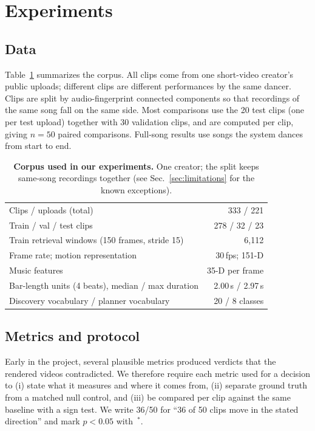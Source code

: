 \documentclass[10pt]{article}
\newcommand{\pairs}[2]{#1/#2}
\begin{document}
\section{Experiments}
\label{sec:experiments}

\subsection{Data}
\label{sec:data}

Table~\ref{tab:data} summarizes the corpus.
All clips come from one short-video creator's public uploads; different clips are different performances by the same dancer.
Clips are split by audio-fingerprint connected components so that recordings of the same song fall on the same side.
Most comparisons use the 20 test clips (one per test upload) together with 30 validation clips, and are computed per clip, giving $n{=}50$ paired comparisons.
Full-song results use songs the system dances from start to end.

\begin{table}[t]
  \centering
  \small
  \caption{\textbf{Corpus used in our experiments.} One creator; the split keeps same-song recordings together (see Sec.~\ref{sec:limitations} for the known exceptions).}
  \label{tab:data}
  \begin{tabular}{@{}lr@{}}
    \toprule
    Clips / uploads (total) & 333 / 221 \\
    Train / val / test clips & 278 / 32 / 23 \\
    Train retrieval windows (150 frames, stride 15) & 6{,}112 \\
    Frame rate; motion representation & 30\,fps; 151-D \\
    Music features & 35-D per frame \\
    Bar-length units (4 beats), median / max duration & 2.00\,s / 2.97\,s \\
    Discovery vocabulary / planner vocabulary & 20 / 8 classes \\
    \bottomrule
  \end{tabular}
\end{table}

\subsection{Metrics and protocol}
\label{sec:metrics}

Early in the project, several plausible metrics produced verdicts that the rendered videos contradicted.
We therefore require each metric used for a decision to (i) state what it measures and where it comes from, (ii) separate ground truth from a matched null control, and (iii) be compared per clip against the same baseline with a sign test.
We write \pairs{36}{50} for ``36 of 50 clips move in the stated direction'' and mark $p{<}0.05$ with~$^*$.
\end{document}
